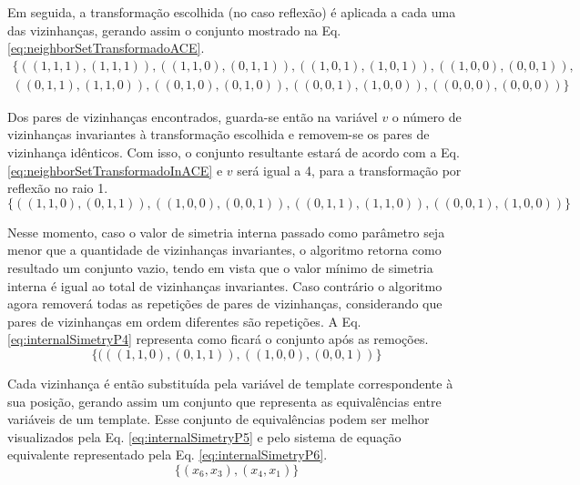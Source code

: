 Em seguida, a transformação escolhida (no caso reflexão) é aplicada a cada uma das vizinhanças, gerando assim o conjunto mostrado na Eq. \eqref{eq:neighborSetTransformadoACE}.  
\begin{equation}
\begin{split}
\{
((1,1,1),(1,1,1)),
((1,1,0),(0,1,1)),
((1,0,1),(1,0,1)),
((1,0,0),(0,0,1)),\\
((0,1,1),(1,1,0)),
((0,1,0),(0,1,0)),
((0,0,1),(1,0,0)),
((0,0,0),(0,0,0))\}
\label{eq:neighborSetTransformadoACE}
\end{split}
\end{equation}

Dos pares de vizinhanças encontrados, guarda-se então na variável $v$ o número de vizinhanças invariantes à transformação escolhida e removem-se os pares de vizinhança idênticos. Com isso, o conjunto resultante estará de acordo com a Eq. \eqref{eq:neighborSetTransformadoInACE} e $v$ será igual a 4, para a transformação por reflexão no raio 1.
\begin{equation}
\{((1,1,0),(0,1,1)),
((1,0,0),(0,0,1)),
((0,1,1),(1,1,0)),
((0,0,1),(1,0,0))\}
\label{eq:neighborSetTransformadoInACE}
\end{equation}

Nesse momento, caso o valor de simetria interna passado como parâmetro seja menor que a quantidade de vizinhanças invariantes, o algoritmo retorna como resultado um conjunto vazio, tendo em vista que o valor mínimo de simetria interna é igual ao total de vizinhanças invariantes. Caso contrário o algoritmo agora removerá todas as repetições de pares de vizinhanças, considerando que pares de vizinhanças em ordem diferentes são repetições. A Eq. \eqref{eq:internalSimetryP4} representa como ficará o conjunto após as remoções.
\begin{equation}
\{(((1,1,0),(0,1,1)), ((1,0,0),(0,0,1))\}
\label{eq:internalSimetryP4}
\end{equation}

Cada vizinhança é então substituída pela variável de template correspondente à sua posição, gerando assim um conjunto que representa as equivalências entre variáveis de um template. Esse conjunto de equivalências podem ser melhor visualizados pela Eq. \eqref{eq:internalSimetryP5} e pelo sistema de equação equivalente representado pela Eq. \eqref{eq:internalSimetryP6}.
\begin{equation}
\{(x_6,x_3), (x_4,x_1)\}
\label{eq:internalSimetryP5}
\end{equation}

